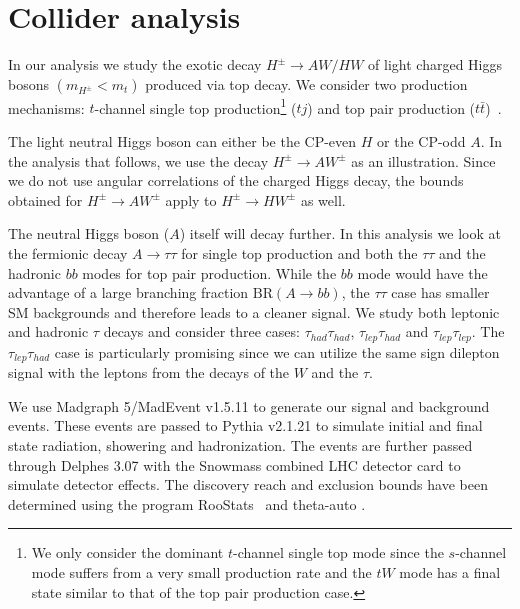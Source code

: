  



\section{Collider analysis}
 \label{sec:light_charged_analysis}


In our analysis we study the exotic decay $H^{\pm} \rightarrow AW/HW$ of light charged Higgs bosons $(m_{H^{\pm}}<m_t)$ produced via top decay. We consider two production mechanisms: $t$-channel single top production\footnote{We only consider the dominant $t$-channel single top mode since the $s$-channel mode suffers from a very small production rate and the $tW$ mode has a final state similar to that of the top pair production case.} ($tj$) and top pair production ($t\bar{t}$)~\cite{Kidonakis:2012db}. 

 
 The light neutral Higgs boson can either be the CP-even $H$ or the CP-odd $A$. In the analysis that follows, we use the decay $H^{\pm} \rightarrow A W^{\pm}$ as an illustration. Since we do not use angular correlations of the charged Higgs decay, the bounds obtained for $H^{\pm} \rightarrow A W^{\pm}$ apply to $H^{\pm} \rightarrow H W^{\pm}$ as well.

The neutral Higgs boson ($A$) itself will decay further. In this analysis we look at the fermionic decay $A \rightarrow\tau\tau$ for single top production and both the $\tau\tau$ and the hadronic $bb$ modes for top pair production. While the $bb$ mode would have the advantage of a large branching fraction $\text{BR}(A \rightarrow bb)$, the $\tau\tau$ case has smaller SM backgrounds and therefore leads to a cleaner signal. We study both leptonic and hadronic $\tau$ decays and consider three cases: $\tau_{had}\tau_{had}$, $\tau_{lep}\tau_{had}$ and $\tau_{lep}\tau_{lep}$. The $\tau_{lep}\tau_{had}$ case is particularly promising since we can utilize the same sign dilepton signal with the leptons from the decays of the $W$ and the $\tau$. 

We use Madgraph 5/MadEvent v1.5.11 \cite{Allwall:2011uj,Alwall2014} to generate our signal and background events. These events are passed to Pythia v2.1.21 \cite{Sjostrand:2006za} to simulate initial and final state radiation, showering and hadronization. The events are further passed through Delphes 3.07 \cite{Ovyn:2009tx} with the Snowmass combined LHC detector card \cite{Anderson:2013kxz} to simulate detector effects. The discovery reach and exclusion bounds have been determined using the program RooStats~\cite{Moneta:2010pm} and theta-auto \cite{thetaauto}. 


